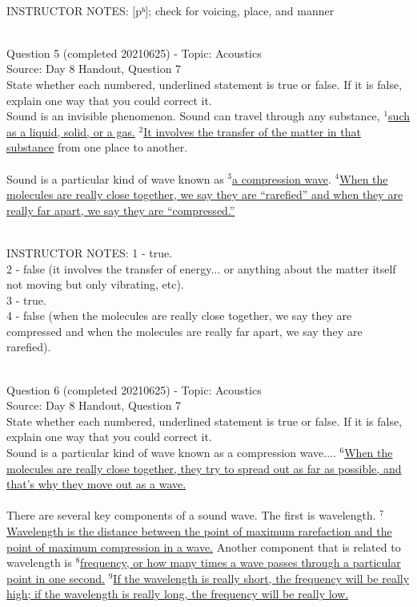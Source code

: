 \documentclass[12pt]{article}
\begin{document}
~\\
INSTRUCTOR NOTES: [pʰ]; check for voicing, place, and manner


~\\

{\large Question 5} (completed 20210625) - Topic: Acoustics\\
Source: Day 8 Handout, Question 7\\

State whether each numbered, underlined statement is true or false. If it is false, explain one way that you could correct it.\\

Sound is an invisible phenomenon. Sound can travel through any substance, $^1$\ul{such as a liquid, solid, or a gas.} $^2$\ul{It involves the transfer of the matter in that substance} from one place to another.\\\\Sound is a particular kind of wave known as $^3$\ul{a compression wave}. $^4$\ul{When the molecules are really close together, we say they are ``rarefied'' and when they are really far apart, we say they are ``compressed.''}


~\\
INSTRUCTOR NOTES: 1 - true.\\2 - false (it involves the transfer of energy... or anything about the matter itself not moving but only vibrating, etc). \\3 - true.\\4 - false (when the molecules are really close together, we say they are compressed and when the molecules are really far apart, we say they are rarefied).


~\\

{\large Question 6} (completed 20210625) - Topic: Acoustics\\
Source: Day 8 Handout, Question 7\\

State whether each numbered, underlined statement is true or false. If it is false, explain one way that you could correct it.\\

Sound is a particular kind of wave known as a compression wave.... $^6$\ul{When the molecules are really close together, they try to spread out as far as possible, and that’s why they move out as a wave.}\\\\There are several key components of a sound wave. The first is wavelength. $^7$\ul{Wavelength is the distance between the point of maximum rarefaction and the point of maximum compression in a wave.} Another component that is related to wavelength is $^8$\ul{frequency, or how many times a wave passes through a particular point in one second.} $^9$\ul{If the wavelength is really short, the frequency will be really high; if the wavelength is really long, the frequency will be really low.} 
\end{document}
